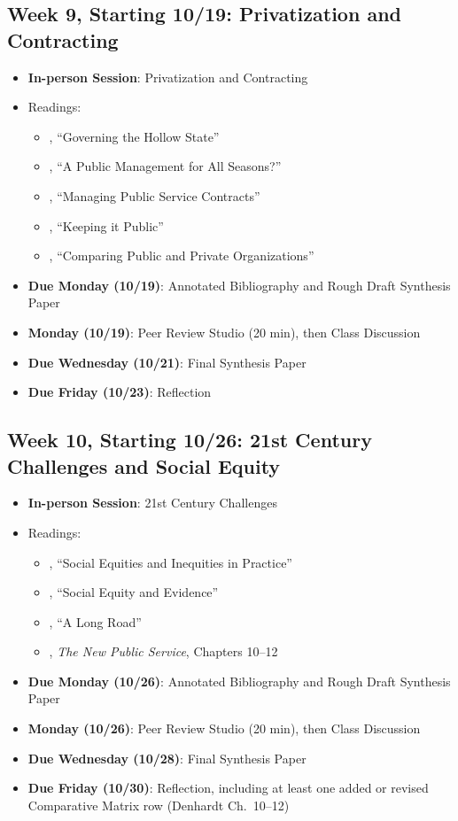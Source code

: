 \documentclass[11pt]{article}     %
\begin{document}
\subsection*{Week 9, Starting 10/19: Privatization and Contracting}
\begin{itemize}
    \item \textbf{In-person Session}: Privatization and Contracting
    \item Readings:
        \begin{itemize}
            \item \citet{milward2000}, ``Governing the Hollow State''
            \item \cite{hood1991}, ``A Public Management for All Seasons?''
            \item \citet{brown2006}, ``Managing Public Service Contracts''
            \item \citet{jos2009}, ``Keeping it Public''
            \item \citet{rainey2000}, ``Comparing Public and Private Organizations''
        \end{itemize}
    \item \textbf{Due Monday (10/19)}: Annotated Bibliography and Rough Draft Synthesis Paper
    \item \textbf{Monday (10/19)}: Peer Review Studio (20 min), then Class Discussion
    \item \textbf{Due Wednesday (10/21)}: Final Synthesis Paper
    \item \textbf{Due Friday (10/23)}: Reflection
\end{itemize}

\subsection*{Week 10, Starting 10/26: 21st Century Challenges and Social Equity}
\begin{itemize}
    \item \textbf{In-person Session}: 21st Century Challenges
    \item Readings:
        \begin{itemize}
            \item \citet{maynard-moody2012}, ``Social Equities and Inequities in Practice''
            \item \citet{GOODEN2017}, ``Social Equity and Evidence''
            \item \citet{mccandless2022}, ``A Long Road''
            \item \citet{Denhardt2015}, \emph{The New Public Service}, Chapters 10--12
        \end{itemize}
    \item \textbf{Due Monday (10/26)}: Annotated Bibliography and Rough Draft Synthesis Paper
    \item \textbf{Monday (10/26)}: Peer Review Studio (20 min), then Class Discussion
    \item \textbf{Due Wednesday (10/28)}: Final Synthesis Paper
    \item \textbf{Due Friday (10/30)}: Reflection, including at least one added or revised Comparative Matrix row (Denhardt Ch.\ 10--12)
\end{itemize}
\end{document}
